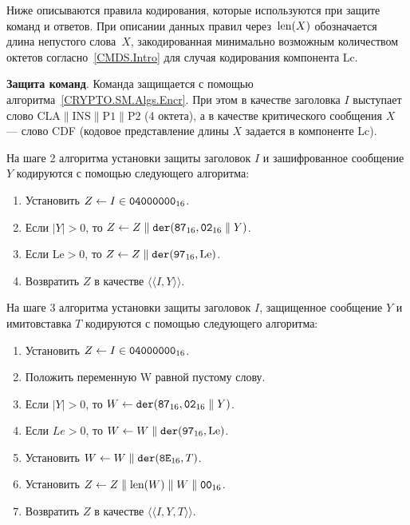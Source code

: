 Ниже описываются правила кодирования, которые используются при защите 
команд и ответов. При описании данных правил через~$\text{len}(X)$ обозначается 
длина непустого слова~$X$, закодированная минимально возможным количеством 
октетов согласно~\ref{CMDS.Intro} для случая кодирования компонента Lc. 

{\bf Защита команд}. 
Команда защищается с помощью алгоритма~\ref{CRYPTO.SM.Algs.Encr}. 
При этом в 
качестве заголовка $I$ выступает слово 
$\text{CLA} \parallel \text{INS} \parallel \text{P1} \parallel \text{P2}$ 
(4 октета), а 
в качестве критического сообщения $X$ --- слово CDF (кодовое представление 
длины $X$ задается в компоненте Lc). 

На шаге 2 алгоритма установки защиты заголовок $I$ и зашифрованное сообщение 
$Y$ кодируются с помощью следующего алгоритма: 

\begin{enumerate}
\item
Установить $Z \gets I \in \texttt{04000000}_{16}$.

\item
Если $|Y| > 0$, то $Z \gets Z \parallel \texttt{der}(\texttt{87}_{16}, \texttt{02}_{16}\parallel Y)$.
\item
Если $\text{Le} > 0$, то $Z\gets Z \parallel \texttt{der}(\texttt{97}_{16}, \text{Le})$.

\item
Возвратить $Z$ в качестве $\langle\langle I, Y \rangle\rangle$.
\end{enumerate}

На шаге 3 алгоритма установки защиты заголовок $I$, защищенное сообщение $Y$ и 
имитовставка $T$ кодируются с помощью следующего алгоритма: 

\begin{enumerate}
\item
Установить $Z\gets I \in \texttt{04000000}_{16}$.
\item
Положить переменную W равной пустому слову.
\item
Если $|Y| > 0$, то $W\gets \texttt{der}(\texttt{87}_{16}, \texttt{02}_{16} \parallel Y)$.
\item
Если $Le > 0$, то $W\gets W \parallel \texttt{der}(\texttt{97}_{16}, \text{Le})$.
\item
Установить $W\gets W \parallel \texttt{der}(\texttt{8E}_{16}, T)$.
\item
Установить $Z\gets Z \parallel \text{len}(W) \parallel W \parallel \texttt{00}_{16}$.
\item
Возвратить $Z$ в качестве $\langle\langle I, Y, T \rangle\rangle$.
\end{enumerate}

